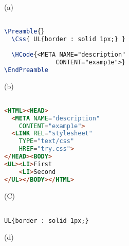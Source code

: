 (a) 

\begin{lstlisting}[language=TeX]

\Preamble{} 
  \Css{ UL{border : solid 1px;} } 
 
  \HCode{<META NAME="description"
              CONTENT="examp1e">} 
\EndPreamble 

\end{lstlisting}

(b) 

\begin{lstlisting}[language=html]

<HTML><HEAD> 
  <META NAME="description" 
    CONTENT="examp1e"> 
  <LINK REL="stylesheet" 
    TYPE="text/css" 
    HREF="try.css"> 
</HEAD><BODY> 
<UL><LI>First 
    <LI>Second 
</UL></BODY></HTML> 

\end{lstlisting}

(C) 

\begin{lstlisting}

UL{border : solid 1px;} 

\end{lstlisting}

(d) 
